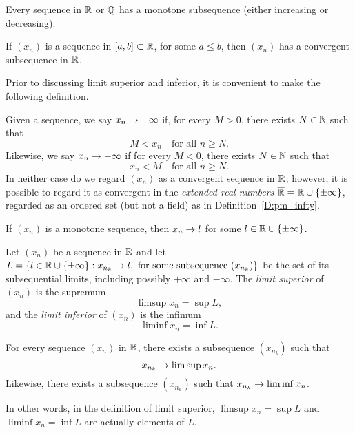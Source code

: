 \documentclass{book}
\begin{document}
\begin{thm}
Every sequence in $\mathbb{R}$ or $\mathbb{Q}$ has a monotone subsequence (either increasing or decreasing).
\label{T:monotone_subseq}
\end{thm}

\begin{cor}
If $(x_n)$ is a sequence in $[a,b] \subset \mathbb{R}$, for some $a \leq b$, then
$(x_n)$ has a convergent subsequence in $\mathbb{R}$.
\label{C:mini-HB}
\end{cor}


Prior to discussing limit superior and inferior, it is convenient to make the following definition. 
\begin{defn}
Given a sequence, we say $x_n \rightarrow +\infty$ if, for every $M > 0$, there exists $N \in \mathbb{N}$ such that
\[
	M < x_n \quad \text{for all $n \geq N$}.
\]
Likewise, we say $x_n \rightarrow - \infty$ if for every $M < 0$, there exists $N \in \mathbb{N}$ such that
\[
	x_n < M \quad \text{for all $n \geq N$}.
\]
In neither case do we regard $(x_n)$ as a convergent sequence in $\mathbb{R}$;
however, it is possible to regard it as convergent in the {\em extended real
numbers} $\overline{\mathbb{R}} = \mathbb{R} \cup \left\{ \pm \infty \right\}$, regarded as an ordered set
(but not a field) as in Definition~\ref{D:pm_infty}.
\label{D:lim_pm_infty}
\end{defn}

\begin{prop}
If $(x_n)$ is a monotone sequence, then $x_n \rightarrow l$ for some $l \in \mathbb{R} \cup \left\{ \pm \infty \right\}$.
\label{P:monotone_extended_converges}
\end{prop}


\begin{defn}
Let $(x_n)$ be a sequence in $\mathbb{R}$ and let $L = \left\{  l \in \mathbb{R} \cup \left\{ \pm
\infty \right\} : x_{n_k} \rightarrow l, \text{ for some subsequence $(x_{n_k})$} \right\}$ be the
set of its subsequential limits, including possibly $+\infty$ and $-\infty$.
The {\em limit superior} of $(x_n)$ is the supremum 
\[
	\limsup x_n = \sup L,
\]
and the {\em limit inferior} of $(x_n)$ is the infimum
\[
	\liminf x_n = \inf L.
\]
\label{D:limsup}
\end{defn}

\begin{prop}
For every sequence $(x_n)$ in $\mathbb{R}$, there exists a subsequence $(x_{n_k})$ such that
\[
	x_{n_k} \rightarrow \limsup x_n.
\]
Likewise, there exists a subsequence $(x_{n_k})$ such that $x_{n_k} \rightarrow \liminf x_n$.

In other words, in the definition of limit superior, $\limsup x_n = \sup L$ and
$\liminf x_n = \inf L$ are actually elements of $L$.
\label{P:limsup_subseq}
\end{prop}
\end{document}
